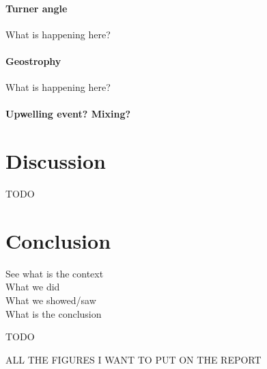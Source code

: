 \documentclass[12pt,a4paper]{article}
\begin{document}
\paragraph{Turner angle}
What is happening here?

\paragraph{Geostrophy}
What is happening here?

\paragraph{Upwelling event? Mixing?}
\citep{arneborg2003}

\section{Discussion}

TODO

\section{Conclusion}

See what is the context\\
What we did\\
What we showed/saw\\
What is the conclusion





\newpage

\appendix
\setcounter{figure}{0}

TODO

ALL THE FIGURES I WANT TO PUT ON THE REPORT
\end{document}
